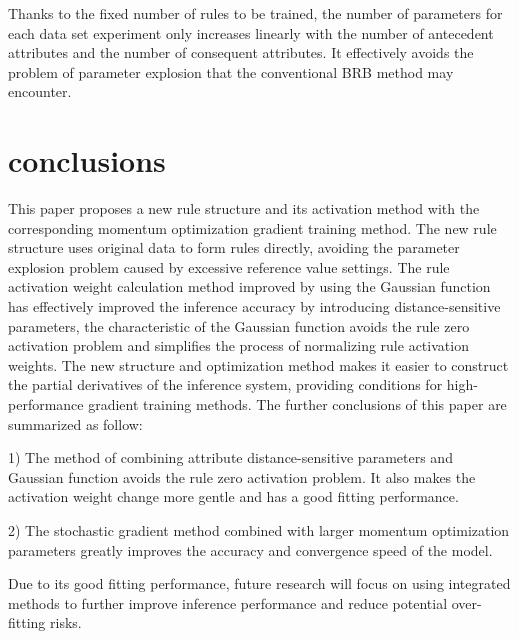 \documentclass{ieeeaccess}
\begin{document}
Thanks to the fixed number of rules to be trained, the number of parameters for each data set experiment only increases linearly with the number of antecedent attributes and the number of consequent attributes.
It effectively avoids the problem of parameter explosion that the conventional BRB method may encounter.

\section{conclusions}
This paper proposes a new rule structure and its activation method with the corresponding momentum optimization gradient training method.
The new rule structure uses original data to form rules directly, avoiding the parameter explosion problem caused by excessive reference value settings.
The rule activation weight calculation method improved by using the Gaussian function has effectively improved the inference accuracy by introducing distance-sensitive parameters,
the characteristic of the Gaussian function avoids the rule zero activation problem and simplifies the process of normalizing rule activation weights.
The new structure and optimization method makes it easier to construct the partial derivatives of the inference system,
providing conditions for high-performance gradient training methods.
The further conclusions of this paper are summarized as follow:

1) The method of combining attribute distance-sensitive parameters and Gaussian function avoids the rule zero activation problem.
It also makes the activation weight change more gentle and has a good fitting performance.

2) The stochastic gradient method combined with larger momentum optimization parameters greatly improves the accuracy and convergence speed of the model.

Due to its good fitting performance, future research will focus on using integrated methods to further improve inference performance and reduce potential over-fitting risks.
\end{document}
